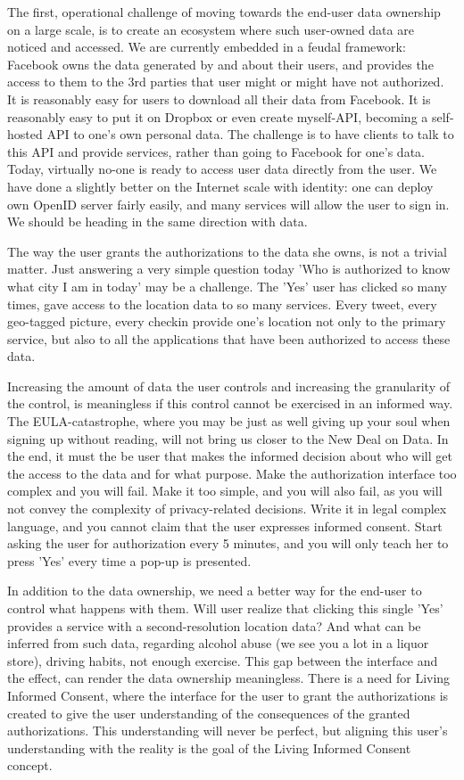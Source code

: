The first, operational challenge of moving towards the end-user data ownership on a large scale, is to create an ecosystem where such user-owned data are noticed and accessed.
We are currently embedded in a feudal framework: Facebook owns the data generated by and about their users, and provides the access to them to the 3rd parties that user might or might have not authorized. 
It is reasonably easy for users to download all their data from Facebook. 
It is reasonably easy to put it on Dropbox or even create myself-API, becoming a self-hosted API to one's own personal data. 
The challenge is to have clients to talk to this API and provide services, rather than going to Facebook for one's data. 
Today, virtually no-one is ready to access user data directly from the user. 
We have done a slightly better on the Internet scale with identity: one can deploy own OpenID server fairly easily, and many services will allow the user to sign in. We should be heading in the same direction with data.

The way the user grants the authorizations to the data she owns, is not a trivial matter.
Just answering a very simple question today 'Who is authorized to know what city I am in today' may be a challenge.
The 'Yes' user has clicked so many times, gave access to the location data to so many services.
Every tweet, every geo-tagged picture, every checkin provide one's location not only to the primary service, but also to all the applications that have been authorized to access these data.

Increasing the amount of data the user controls and increasing the granularity of the control, is meaningless if this control cannot be exercised in an informed way.
The EULA-catastrophe, where you may be just as well giving up your soul when signing up without reading, will not bring us closer to the New Deal on Data.
In the end, it must the be user that makes the informed decision about who will get the access to the data and for what purpose. 
Make the authorization interface too complex and you will fail. 
Make it too simple, and you will also fail, as you will not convey the complexity of privacy-related decisions. 
Write it in legal complex language, and you cannot claim that the user expresses informed consent. 
Start asking the user for authorization every 5 minutes, and you will only teach her to press 'Yes' every time a pop-up is presented. 

In addition to the data ownership, we need a better way for the end-user to control what happens with them. 
Will user realize that clicking this single 'Yes' provides a service with a second-resolution location data? 
And what can be inferred from such data, regarding alcohol abuse (we see you a lot in a liquor store), driving habits, not enough exercise. 
This gap between the interface and the effect, can render the data ownership meaningless. 
There is a need for Living Informed Consent, where the interface for the user to grant the authorizations is created to give the user understanding of the consequences of the granted authorizations.
This understanding will never be perfect, but aligning this user's understanding with the reality is the goal of the Living Informed Consent concept. 

